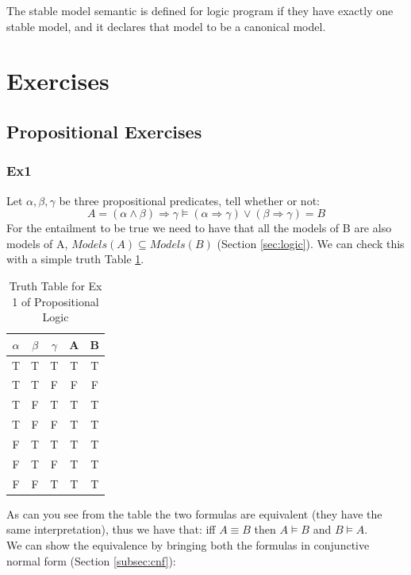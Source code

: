\documentclass[10pt,a4paper]{article}
\newcommand{\changelocaltocdepth}[1]{%
  \addtocontents{toc}{\protect\setcounter{tocdepth}{#1}}%
  \setcounter{tocdepth}{#1}%
}
\begin{document}
The stable model semantic is defined for logic program if they have exactly one stable model, and it declares that model to be a canonical model.




\newpage
\changelocaltocdepth{2}

\section{Exercises}

\subsection{Propositional Exercises}


\subsubsection{Ex1}
Let $\alpha, \beta, \gamma$ be three propositional predicates, tell whether or
not:
\[A=(\alpha \wedge \beta) \Rightarrow \gamma \models (\alpha \Rightarrow \gamma) \vee (\beta \Rightarrow \gamma)=B\]
For the entailment to be true we need to have that all the models of B are also models of A, $Models(A)\subseteq Models(B)$ (Section \ref{sec:logic}). We can check this with a simple truth Table \ref{tab:prop_logic_ex1}.
\begin{table}[H]
    \begin{tabular}{|c|c|c|c|c|}
        \hline
        $\alpha$ & $\beta$ & $\gamma$ & A & B \\ \hline
        T      & T     & T      & T & T \\ \hline
        T      & T     & F      & F & F \\ \hline
        T      & F     & T      & T & T \\ \hline
        T      & F     & F      & T & T \\ \hline
        F      & T     & T      & T & T \\ \hline
        F      & T     & F      & T & T \\ \hline
        F      & F     & T      & T & T \\
        \hline
    \end{tabular}
\caption{Truth Table for Ex 1 of Propositional Logic}
\label{tab:prop_logic_ex1}
\end{table}

As can you see from the table the two formulas are equivalent (they have the same interpretation), thus we have that: iff $A \equiv B$ then $A\models B$ and $B \models A$.\\
We can show the equivalence by bringing both the formulas in conjunctive normal form (Section \ref{subsec:cnf}):
\end{document}
